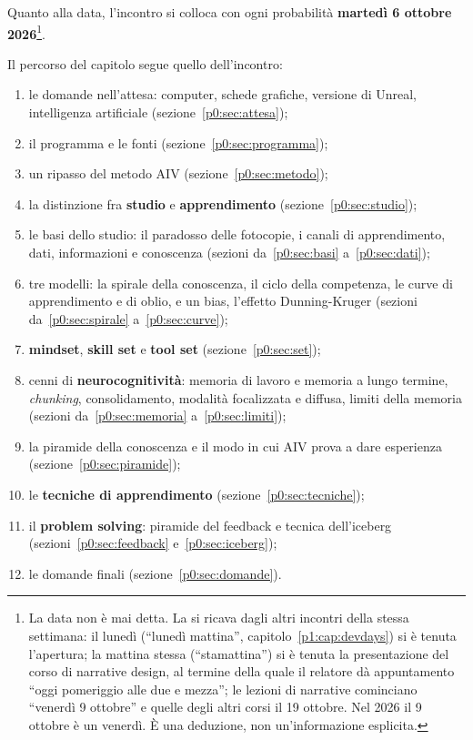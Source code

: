 Quanto alla data, l'incontro si colloca con ogni probabilità
\textbf{martedì 6 ottobre 2026}\footnote{La data non è mai detta. La si
ricava dagli altri incontri della stessa settimana: il lunedì (``lunedì
mattina'', capitolo~\ref{p1:cap:devdays}) si è tenuta l'apertura; la
mattina stessa (``stamattina'') si è tenuta la presentazione del corso di
narrative design, al termine della quale il relatore dà appuntamento ``oggi
pomeriggio alle due e mezza''; le lezioni di narrative cominciano ``venerdì
9 ottobre'' e quelle degli altri corsi il 19 ottobre. Nel 2026 il 9 ottobre
è un venerdì. È una deduzione, non un'informazione esplicita.}.

Il percorso del capitolo segue quello dell'incontro:
\begin{enumerate}
  \item le domande nell'attesa: computer, schede grafiche, versione di
        Unreal, intelligenza artificiale (sezione~\ref{p0:sec:attesa});
  \item il programma e le fonti (sezione~\ref{p0:sec:programma});
  \item un ripasso del metodo AIV (sezione~\ref{p0:sec:metodo});
  \item la distinzione fra \textbf{studio} e \textbf{apprendimento}
        (sezione~\ref{p0:sec:studio});
  \item le basi dello studio: il paradosso delle fotocopie, i canali di
        apprendimento, dati, informazioni e conoscenza
        (sezioni da~\ref{p0:sec:basi} a~\ref{p0:sec:dati});
  \item tre modelli: la spirale della conoscenza, il ciclo della
        competenza, le curve di apprendimento e di oblio, e un bias,
        l'effetto Dunning-Kruger (sezioni da~\ref{p0:sec:spirale}
        a~\ref{p0:sec:curve});
  \item \textbf{mindset}, \textbf{skill set} e \textbf{tool set}
        (sezione~\ref{p0:sec:set});
  \item cenni di \textbf{neurocognitività}: memoria di lavoro e memoria a
        lungo termine, \emph{chunking}, consolidamento, modalità
        focalizzata e diffusa, limiti della memoria (sezioni
        da~\ref{p0:sec:memoria} a~\ref{p0:sec:limiti});
  \item la piramide della conoscenza e il modo in cui AIV prova a dare
        esperienza (sezione~\ref{p0:sec:piramide});
  \item le \textbf{tecniche di apprendimento}
        (sezione~\ref{p0:sec:tecniche});
  \item il \textbf{problem solving}: piramide del feedback e tecnica
        dell'iceberg (sezioni~\ref{p0:sec:feedback} e~\ref{p0:sec:iceberg});
  \item le domande finali (sezione~\ref{p0:sec:domande}).
\end{enumerate}

